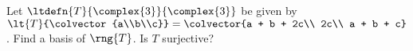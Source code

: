 Let $\ltdefn{T}{\complex{3}}{\complex{3}} $ be given by 
$\lt{T}{\colvector{a\\b\\c}} = \colvector{a + b + 2c\\ 2c\\ a + b + c}$.  Find a basis of $\rng{T}$.  Is $T$ surjective?  
%
